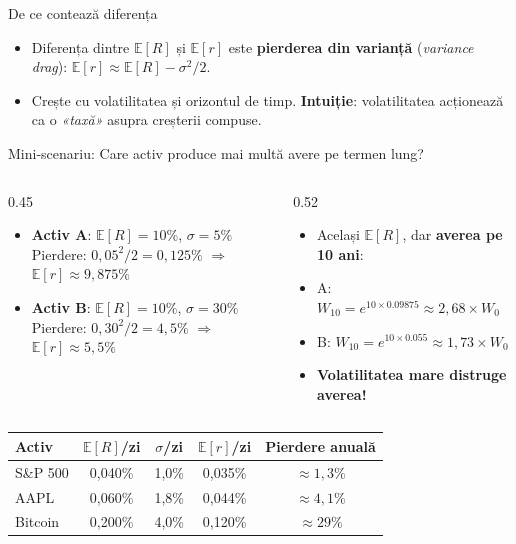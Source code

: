 \documentclass[9pt, aspectratio=169, t]{beamer}
\theoremstyle{definition}
\newcommand{\E}{\mathbb{E}}
\begin{document}
\begin{frame}[shrink=5]{De ce contează diferența}
\begin{itemize}\small\setlength{\itemsep}{0pt}
    \item Diferența dintre $\E[R]$ și $\E[r]$ este \textbf{pierderea din varianță} (\textit{variance drag}): $\E[r] \approx \E[R] - \sigma^2/2$.
    \item Crește cu volatilitatea și orizontul de timp. \textbf{Intuiție}: volatilitatea acționează ca o \textit{«taxă»} asupra creșterii compuse.
\end{itemize}
\vspace{0.02cm}
\begin{exampleblock}{Mini-scenariu: Care activ produce mai multă avere pe termen lung?}
\begin{columns}[T]
\begin{column}{0.45\textwidth}
\begin{itemize}\small\setlength{\itemsep}{0pt}
    \item \textbf{Activ A}: $\E[R] = 10\%$, $\sigma = 5\%$\\
    Pierdere: $0{,}05^2/2 = 0{,}125\%$ $\Rightarrow$ $\E[r] \approx 9{,}875\%$
    \item \textbf{Activ B}: $\E[R] = 10\%$, $\sigma = 30\%$\\
    Pierdere: $0{,}30^2/2 = 4{,}5\%$ $\Rightarrow$ $\E[r] \approx 5{,}5\%$
\end{itemize}
\end{column}
\begin{column}{0.52\textwidth}
\begin{itemize}\small\setlength{\itemsep}{0pt}
    \item Același $\E[R]$, dar \textbf{averea pe 10 ani}:
    \item A: $W_{10} = e^{10 \times 0.09875} \approx 2{,}68 \times W_0$
    \item B: $W_{10} = e^{10 \times 0.055} \approx 1{,}73 \times W_0$
    \item \textbf{Volatilitatea mare distruge averea!}
\end{itemize}
\end{column}
\end{columns}
\end{exampleblock}
\vspace{0.02cm}
\begin{center}
{\footnotesize
\renewcommand{\arraystretch}{1.1}
\begin{tabular}{lcccc}
\toprule
\textbf{Activ} & $\E[R]$/zi & $\sigma$/zi & $\E[r]$/zi & Pierdere anuală \\
\midrule
S\&P 500 & 0,040\% & 1,0\% & 0,035\% & $\approx 1{,}3\%$ \\
AAPL     & 0,060\% & 1,8\% & 0,044\% & $\approx 4{,}1\%$ \\
Bitcoin  & 0,200\% & 4,0\% & 0,120\% & $\approx 29\%$ \\
\bottomrule
\end{tabular}
}
\end{center}
\end{frame}
\end{document}
